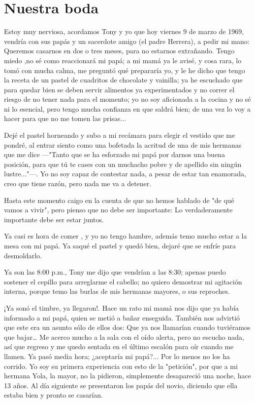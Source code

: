 \documentclass[letterpaper, 12pt]{book}
\begin{document}
\chapter{Nuestra boda}
Estoy muy nerviosa, acordamos Tony y yo que hoy viernes 9 de  marzo de 1969, vendría con sus papás y un sacerdote amigo (el padre Herrera), a pedir mi mano: Queremos casarnos en dos o tres meses, para no estarnos extrañando.  Tengo miedo ,no sé como reaccionará mi papá; a mi mamá ya le avisé, y cosa rara, lo tomó con mucha calma, me preguntó qué prepararía yo, y le he dicho que tengo la receta de un pastel de cuadritos de chocolate y vainilla; ya he escuchado que para quedar bien se deben servir alimentos ya experimentados y no correr el riesgo de no tener nada para el momento; yo no soy aficionada a la cocina y no sé ni lo esencial, pero tengo mucha confianza en que saldrá bien; de una vez lo voy a hacer para que no me tomen las prisas...

Dejé el pastel horneando y subo a mi recámara para elegir el vestido que me pondré, al entrar siento como una bofetada la acritud de una de mis hermanas que me dice ---"Tanto que se ha esforzado mi papá por darnos una buena posición, para que tú te cases con un muchacho pobre y de apellido sin ningún lustre..."---. Yo no soy capaz de contestar nada, a pesar de estar tan enamorada, creo que tiene razón, pero nada me va a detener. 
 
Hasta este momento caigo en la cuenta de que no hemos hablado de "de qué vamos a vivir", pero pienso que no debe ser importante: Lo verdaderamente importante debe ser estar juntos.

Ya casi es hora de comer , y yo no tengo hambre, además temo mucho estar a la mesa con mi papá. Ya saqué el pastel y quedó bien, dejaré que se enfríe para desmoldarlo.

Ya son las 8:00 p.m., Tony me dijo que vendrían a las 8:30; apenas puedo sostener el cepillo para arreglarme el cabello; no quiero demostrar mi agitación interna, porque temo las burlas de mis hermanas mayores, o sus reproches.

¡Ya sonó el timbre, ya llegaron!. Hace un rato mi mamá nos dijo que ya había informado a mi papá, quien se metió a bañar enseguida. También nos advirtió que este era un asunto sólo de ellos dos: Que ya nos llamarían cuando tuviéramos que bajar\ldots
Me acerco mucho a la sala con el oído alerta, pero no escucho nada, así que regreso y me quedo sentada en el último escalón para oír cuando me llamen. Ya pasó media hora; ¿aceptaría mi papá?... Por lo menos no los ha corrido. Yo soy su primera experiencia con esto de la "petición", por que a mi hermana Yola, la mayor, no la pidieron, simplemente desapareció una noche, hace 13 años.  Al día siguiente se presentaron los papás del novio, diciendo que ella estaba bien y pronto se casarían.
\end{document}
